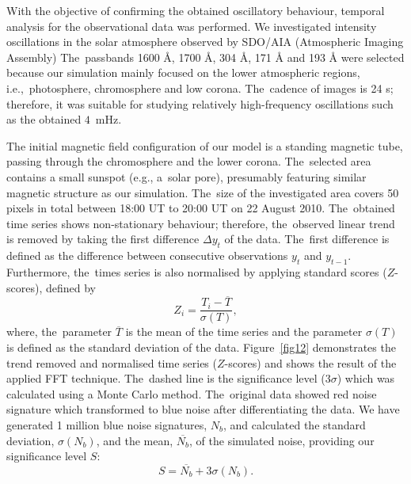 \documentclass[physics,article,accept,pdftex,moreauthors]{Definitions/mdpi}
\begin{document}
With the objective of confirming the obtained oscillatory behaviour, temporal analysis for the observational 
 {data}  %
was performed. We investigated intensity oscillations in the solar atmosphere observed by 
SDO/AIA  {(Atmospheric Imaging Assembly)} %
 The~passbands 1600 {\AA}, 1700 {\AA}, 304 {\AA}, 171 {\AA} and 193 {\AA} were selected because our simulation mainly focused on the lower atmospheric regions, i.e.,~photosphere, chromosphere and low corona. The~cadence of images is 24 s; therefore, it was suitable for studying relatively high-frequency oscillations such as the obtained $4$~mHz.

The initial magnetic field configuration of our model is a standing magnetic tube, passing through the chromosphere and the lower corona. 
The~selected area contains a small sunspot (e.g., a~solar pore), presumably featuring similar magnetic structure as our simulation. The~size 
of the investigated area covers 50 pixels in total between 18:00 UT to 20:00 UT on 22 August 2010. The~obtained time series shows 
non-stationary behaviour; therefore, the~observed linear trend is removed by taking the first difference $\Delta  y_{t}$ of the data. 
The~first difference is defined as the difference between consecutive observations $y_{t}$ and $y_{t-1}$. Furthermore, the~times series is 
also normalised by applying standard scores ({$Z$}-scores), %
defined by 
\begin{equation}
	Z_{i} = \frac {T_{i} - \overline{T}}  {\sigma(T)},
	\label{z_score}
\end{equation}
where, the~parameter $\overline{T}$ is the mean of the time series and the parameter $\sigma(T)$ is defined as the standard deviation of the data. 
Figure~\ref{fig12} %
 {demonstrates} the trend removed and normalised time series {($Z$-scores)} %
 {and shows} %
the result of the applied FFT technique. The~dashed line is the significance level ($3 \sigma$) which was calculated using a 
Monte Carlo method. The~original data showed red noise signature which transformed to blue noise after differentiating the data. 
We have generated 1 million blue noise {signatures, $N_{b}$,} and calculated the standard {deviation, 
$\sigma(N_{b})$,} 
and the 
 {mean, $\overline{N_{b}}$,} %
of the simulated noise, providing our significance level $S$:
\begin{equation}
    S = \overline{N_{b}} + 3 \sigma(N_{b}).
\end{equation}
\end{document}
